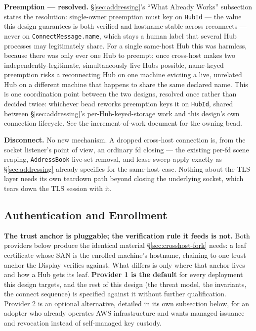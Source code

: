 \documentclass[a4paper,10pt]{article}
\newcommand{\field}[1]{\texttt{#1}}
\begin{document}
\textbf{Preemption --- resolved.}  \S\ref{sec:addressing}'s ``What Already
Works'' subsection states the resolution: single-owner preemption must key
on \texttt{HubId} --- the value this design guarantees is both verified
and hostname-stable across reconnects --- never on
\field{ConnectMessage.name}, which stays a human label that several Hub
processes may legitimately share.  For a single same-host Hub this was
harmless, because there was only ever one Hub to preempt; once cross-host
makes two independently-legitimate, simultaneously live Hubs possible,
name-keyed preemption risks a reconnecting Hub on one machine evicting a
live, unrelated Hub on a different machine that happens to share the same
declared name.  This is one coordination point between the two designs,
resolved once rather than decided twice: whichever bead reworks preemption
keys it on \texttt{HubId}, shared between \S\ref{sec:addressing}'s
per-Hub-keyed-storage work and this design's own connection lifecycle.
See the increment-of-work document for the owning bead.

\textbf{Disconnect.}  No new mechanism.  A dropped cross-host connection
is, from the socket listener's point of view, an ordinary fd closing ---
the existing per-fd scene reaping, \texttt{AddressBook} live-set removal,
and lease sweep apply exactly as \S\ref{sec:addressing} already specifies
for the same-host case.  Nothing about the TLS layer needs its own
teardown path beyond closing the underlying socket, which tears down the
TLS session with it.

\subsection{Authentication and Enrollment}\label{sec:crosshost-enroll}

\textbf{The trust anchor is pluggable; the verification rule it feeds is
not.}  Both providers below produce the identical material
\S\ref{sec:crosshost-fork} needs: a leaf certificate whose SAN is the
enrolled machine's hostname, chaining to one trust anchor the Display
verifies against.  What differs is only where that anchor lives and how a
Hub gets its leaf.  \textbf{Provider 1 is the default} for every
deployment this design targets, and the rest of this design (the threat
model, the invariants, the connect sequence) is specified against it
without further qualification.  Provider 2 is an optional alternative,
detailed in its own subsection below, for an adopter who already operates
AWS infrastructure and wants managed issuance and revocation instead of
self-managed key custody.
\end{document}
